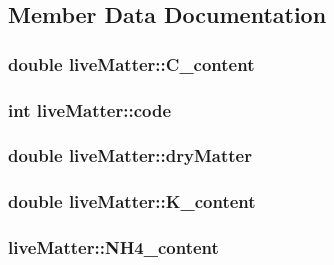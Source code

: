 \subsection{Member Data Documentation}
\hypertarget{classlive_matter_abe13a37fe5a11f5fcb286b4031c4fc87}{
\subsubsection[{C\_\-content}]{\setlength{\rightskip}{0pt plus 5cm}double {\bf liveMatter::C\_\-content}}}
\label{classlive_matter_abe13a37fe5a11f5fcb286b4031c4fc87}
\hypertarget{classlive_matter_af8311f0490e29d4a872e3bb9588099de}{
\subsubsection[{code}]{\setlength{\rightskip}{0pt plus 5cm}int {\bf liveMatter::code}}}
\label{classlive_matter_af8311f0490e29d4a872e3bb9588099de}
\hypertarget{classlive_matter_a1a622bc1c2258ae716f26c9dd3bf66d1}{
\subsubsection[{dryMatter}]{\setlength{\rightskip}{0pt plus 5cm}double {\bf liveMatter::dryMatter}}}
\label{classlive_matter_a1a622bc1c2258ae716f26c9dd3bf66d1}
\hypertarget{classlive_matter_aff29c19f063203a2e4dffc04986adc74}{
\subsubsection[{K\_\-content}]{\setlength{\rightskip}{0pt plus 5cm}double {\bf liveMatter::K\_\-content}}}
\label{classlive_matter_aff29c19f063203a2e4dffc04986adc74}
\hypertarget{classlive_matter_a8e7a9da472ef95f8426cab359acae69f}{
\subsubsection[{NH4\_\-content}]{ {\bf liveMatter::NH4\_\-content}}}

